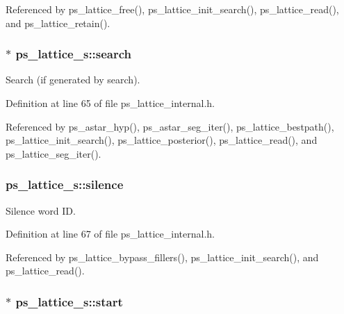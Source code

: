 \-Referenced by ps\-\_\-lattice\-\_\-free(), ps\-\_\-lattice\-\_\-init\-\_\-search(), ps\-\_\-lattice\-\_\-read(), and ps\-\_\-lattice\-\_\-retain().

\subsubsection[{search}]{$\ast$ {\bf ps\-\_\-lattice\-\_\-s\-::search}}\label{structps__lattice__s_a9ebaeb7be7a83980569f0c544eb6babb}


\-Search (if generated by search). 



\-Definition at line 65 of file ps\-\_\-lattice\-\_\-internal.\-h.



\-Referenced by ps\-\_\-astar\-\_\-hyp(), ps\-\_\-astar\-\_\-seg\-\_\-iter(), ps\-\_\-lattice\-\_\-bestpath(), ps\-\_\-lattice\-\_\-init\-\_\-search(), ps\-\_\-lattice\-\_\-posterior(), ps\-\_\-lattice\-\_\-read(), and ps\-\_\-lattice\-\_\-seg\-\_\-iter().

\subsubsection[{silence}]{ {\bf ps\-\_\-lattice\-\_\-s\-::silence}}\label{structps__lattice__s_acd3f3ab2649f649ba33bf2a422cf12b8}


\-Silence word \-I\-D. 



\-Definition at line 67 of file ps\-\_\-lattice\-\_\-internal.\-h.



\-Referenced by ps\-\_\-lattice\-\_\-bypass\-\_\-fillers(), ps\-\_\-lattice\-\_\-init\-\_\-search(), and ps\-\_\-lattice\-\_\-read().

\subsubsection[{start}]{$\ast$ {\bf ps\-\_\-lattice\-\_\-s\-::start}}\label{structps__lattice__s_a5d936695a3813e117d20b585d48db8fe}



